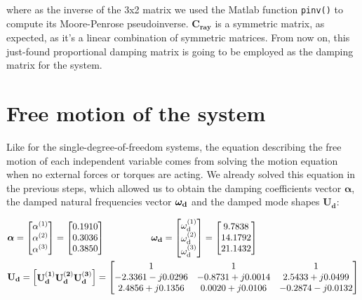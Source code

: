 \documentclass[a4paper,12pt,oneside]{article}
\begin{document}
where as the inverse of the 3x2 matrix we used the Matlab function \lstinline!pinv()! to compute its Moore-Penrose pseudoinverse. $ \mathbf{C_{ray}} $ is a symmetric matrix, as expected, as it's a linear combination of symmetric matrices. From now on, this just-found proportional damping matrix is going to be employed as the damping matrix for the system.


\section{Free motion of the system}
\label{sec:free_motion}

Like for the single-degree-of-freedom systems, the equation describing the free motion of each independent variable comes from solving the motion equation when no external forces or torques are acting. We already solved this equation in the previous steps, which allowed us to obtain the damping coefficients vector $ \bm{\alpha} $, the damped natural frequencies vector $ \bm{\omega_\textup{\textbf{d}}} $ and the damped mode shapes $ \mathbf{U_d} $:

\[ \begin{split}
	& \bm{\alpha} =	\begin{bmatrix}
									\alpha^{(1)} \\
									\alpha^{(2)} \\
									\alpha^{(3)}
								\end{bmatrix} = \begin{bmatrix}
																	0.1910 \\
																	0.3036 \\
																	0.3850
																\end{bmatrix} \hspace{50pt}
		\bm{\omega_\textup{\textbf{d}}} =	\begin{bmatrix}
																				\omega_\textup{d}^{(1)} \\
																				\omega_\textup{d}^{(2)} \\
																				\omega_\textup{d}^{(3)} \\
																			\end{bmatrix} = \begin{bmatrix}
																												9.7838 \\
																												14.1792 \\
																												21.1432
																											\end{bmatrix} \\
	& \mathbf{U_d} =	\begin{bmatrix}
											\mathbf{U_d^{(1)}}
											\mathbf{U_d^{(2)}}
											\mathbf{U_d^{(3)}}
										\end{bmatrix} =
		\begin{bmatrix}
			1									& 1									& 1 \\
			-2.3361 - j0.0296	& -0.8731 + j0.0014	& 2.5433 + j0.0499 \\
			2.4856 + j0.1356	& 0.0020 + j0.0106	& -0.2874 -j0.0132
		\end{bmatrix}
\end{split} \]
\end{document}
